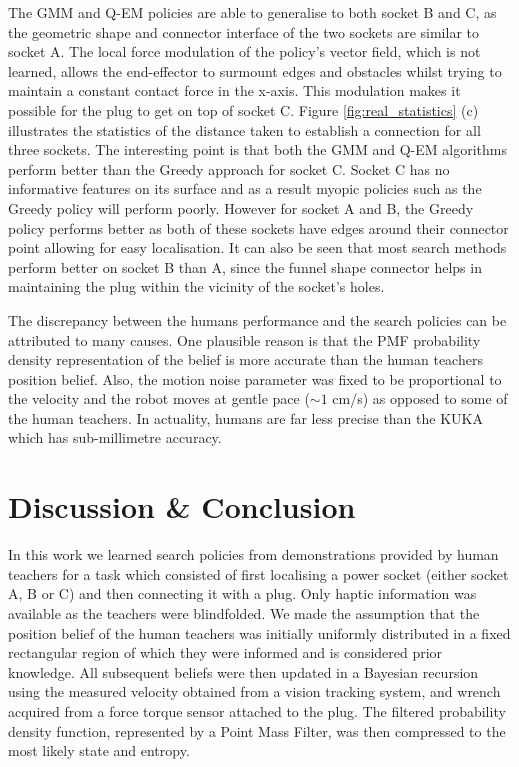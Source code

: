The GMM and Q-EM policies are able to generalise to both socket B and C, as the geometric shape and connector interface of the 
two sockets are similar to socket A. The local force modulation of the policy's vector field, which is not learned, allows the 
end-effector to surmount edges and obstacles whilst trying to maintain a constant contact force in the x-axis. This modulation makes it possible for the plug to get on top of socket C.
Figure \ref{fig:real_statistics} (c) illustrates the statistics of the distance taken to establish a connection for all three sockets. 
The interesting point is that both the GMM and Q-EM algorithms perform better than the Greedy approach for socket C. Socket C has no informative 
features on its surface and as a result myopic policies such as the Greedy policy will perform poorly. However for socket A 
and B, the Greedy policy performs better as both of these sockets have edges around their connector point allowing for easy localisation. 
It can also be seen that most search methods perform better on socket B than A, since the funnel shape connector helps in maintaining the plug 
within the vicinity of the socket's holes. 


The discrepancy between the humans performance and the search policies can be attributed to many causes. One plausible reason is 
that the PMF probability density representation of the belief is more accurate than the human teachers position belief. 
Also, the motion noise parameter was fixed to be proportional to the velocity and the robot moves at gentle pace ($\sim1$ cm/s) as 
opposed to some of the human teachers. In actuality, humans are far less precise than the KUKA which has sub-millimetre accuracy.

\section{Discussion \& Conclusion}\label{ch4:conclusion}
%
%
%

In this work we learned search policies from demonstrations provided by human teachers for a task
which consisted of first localising a power socket (either socket A, B or C) and then connecting it with a plug. Only haptic information 
was available as the teachers were blindfolded. We made the assumption that the position belief of the human teachers 
was initially uniformly distributed in a fixed rectangular region of which they were 
informed and is considered prior knowledge. All subsequent beliefs were then updated in a Bayesian recursion 
using the measured velocity obtained from a vision tracking system, and wrench acquired from a force torque sensor attached 
to the plug. The filtered probability density function, represented by a Point Mass Filter, was then compressed to the 
most likely state and entropy.

